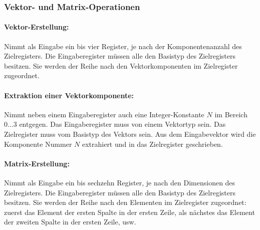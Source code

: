 \documentclass[twoside,a4paper,fleqn,12pt]{book}
\begin{document}
\subsubsection{Vektor- und Matrix-Operationen}

\paragraph{Vektor-Erstellung:} Nimmt als Eingabe ein bis vier Register, je nach der Komponentenanzahl des Zielregisters. Die Eingaberegister müssen alle
den Basistyp des Zielregisters besitzen. Sie werden der Reihe nach den Vektorkomponenten im Zielregister zugeordnet.

\paragraph{Extraktion einer Vektorkomponente:} Nimmt neben einem Eingaberegister auch eine Integer-Konstante $N$ im Bereich $0 \dots 3$ entgegen.
Das Eingaberegister muss von einem Vektortyp sein. Das Zielregister muss vom Basistyp des Vektors sein.
Aus dem Eingabevektor wird die Komponente Nummer $N$ extrahiert und in das Zielregister geschrieben.

\paragraph{Matrix-Erstellung:} Nimmt als Eingabe ein bis sechzehn Register, je nach den Dimensionen des Zielregisters. Die Eingaberegister müssen alle
den Basistyp des Zielregisters besitzen. Sie werden der Reihe nach den Elementen im Zielregister zugeordnet: zuerst das Element der ersten Spalte in der ersten Zeile,
als nächstes das Element der zweiten Spalte in der ersten Zeile, usw.
\end{document}
